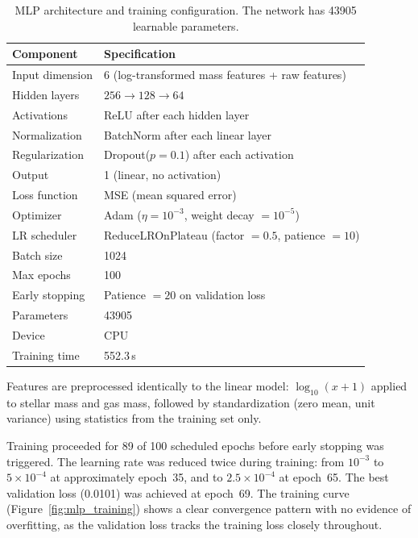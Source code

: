 \documentclass[12pt, a4paper]{article}
\begin{document}
\begin{table}[H]
  \centering
  \caption{MLP architecture and training configuration.  The network has \num{43905} learnable parameters.}
  \label{tab:mlp_arch}
  \begin{tabular}{@{}ll@{}}
    \toprule
    Component & Specification \\
    \midrule
    Input dimension   & 6 (log-transformed mass features + raw features) \\
    Hidden layers     & $256 \rightarrow 128 \rightarrow 64$ \\
    Activations       & ReLU after each hidden layer \\
    Normalization     & BatchNorm after each linear layer \\
    Regularization    & Dropout($p = 0.1$) after each activation \\
    Output            & 1 (linear, no activation) \\
    \midrule
    Loss function     & MSE (mean squared error) \\
    Optimizer         & Adam ($\eta = 10^{-3}$, weight decay $= 10^{-5}$) \\
    LR scheduler      & ReduceLROnPlateau (factor $= 0.5$, patience $= 10$) \\
    Batch size        & 1024 \\
    Max epochs        & 100 \\
    Early stopping    & Patience $= 20$ on validation loss \\
    \midrule
    Parameters        & \num{43905} \\
    Device            & CPU \\
    Training time     & 552.3\,s \\
    \bottomrule
  \end{tabular}
\end{table}

Features are preprocessed identically to the linear model: $\log_{10}(x + 1)$ applied to stellar mass and gas mass, followed by standardization (zero mean, unit variance) using statistics from the training set only.

Training proceeded for 89 of 100 scheduled epochs before early stopping was triggered.  The learning rate was reduced twice during training: from $10^{-3}$ to $5 \times 10^{-4}$ at approximately epoch~35, and to $2.5 \times 10^{-4}$ at epoch~65.  The best validation loss (0.0101) was achieved at epoch~69.  The training curve (Figure~\ref{fig:mlp_training}) shows a clear convergence pattern with no evidence of overfitting, as the validation loss tracks the training loss closely throughout.
\end{document}
